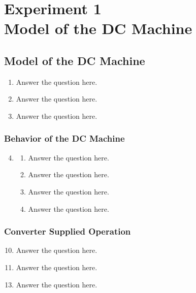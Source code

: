 \documentclass[12pt,a4paper, openany]{book}
\begin{document}




\setcounter{chapter}{0} %
\chapter{Experiment 1 \\ Model of the DC Machine}

\section{Model of the DC Machine}

\begin{enumerate}
\item {\bf *} Answer the question here.
\item {\bf *} Answer the question here.
\item {\bf *} Answer the question here.
\end{enumerate}


\subsection{Behavior of the DC Machine}

\begin{enumerate}
\setcounter{enumi}{3} %
\item {\bf *} 

\begin{enumerate}
\item {\bf} Answer the question here.
\item {\bf} Answer the question here.
\item {\bf} Answer the question here.
\item {\bf} Answer the question here.
\end{enumerate}
\end{enumerate}

\subsection{Converter Supplied Operation}

\begin{enumerate}
\setcounter{enumi}{9} %
\item {\bf *} Answer the question here.
\item {\bf *} Answer the question here.
\end{enumerate}

\begin{enumerate}
\setcounter{enumi}{12} %
\item {\bf *} Answer the question here.
\end{enumerate}
\end{document}
